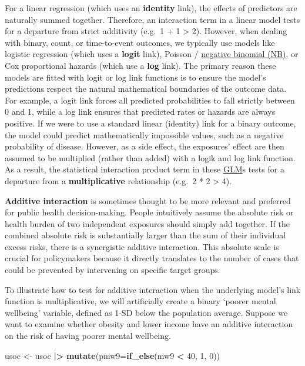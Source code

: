 \documentclass[
]{book}
\newenvironment{Shaded}{\begin{snugshade}}{\end{snugshade}}
\newcommand{\AttributeTok}[1]{\textcolor[rgb]{0.13,0.29,0.53}{#1}}
\newcommand{\DecValTok}[1]{\textcolor[rgb]{0.00,0.00,0.81}{#1}}
\newcommand{\FunctionTok}[1]{\textcolor[rgb]{0.13,0.29,0.53}{\textbf{#1}}}
\newcommand{\NormalTok}[1]{#1}
\newcommand{\OtherTok}[1]{\textcolor[rgb]{0.56,0.35,0.01}{#1}}
\newcommand{\SpecialCharTok}[1]{\textcolor[rgb]{0.81,0.36,0.00}{\textbf{#1}}}
\begin{document}
For a linear regression (which uses an \textbf{identity} link), the effects of predictors are naturally summed together. Therefore, an interaction term in a linear model tests for a departure from strict additivity (e.g.~1 + 1 \textgreater{} 2). However, when dealing with binary, count, or time-to-event outcomes, we typically use models like logistic regression (which uses a \textbf{logit} link), Poisson / \hyperref[acronyms_NB]{negative binomial (NB)}, or Cox proportional hazards (which use a \textbf{log} link). The primary reason these models are fitted with logit or log link functions is to ensure the model's predictions respect the natural mathematical boundaries of the outcome data. For example, a logit link forces all predicted probabilities to fall strictly between 0 and 1, while a log link ensures that predicted rates or hazards are always positive. If we were to use a standard linear (identity) link for a binary outcome, the model could predict mathematically impossible values, such as a negative probability of disease. However, as a side effect, the exposures' effect are then assumed to be multiplied (rather than added) with a logik and log link function. As a result, the statistical interaction product term in these \hyperref[acronyms_GLM]{GLM}s tests for a departure from a \textbf{multiplicative} relationship (e.g.~2 * 2 \textgreater{} 4).

\textbf{Additive interaction} is sometimes thought to be more relevant and preferred for public health decision-making. People intuitively assume the absolute risk or health burden of two independent exposures should simply add together. If the combined absolute risk is substantially larger than the sum of their individual excess risks, there is a synergistic additive interaction. This absolute scale is crucial for policymakers because it directly translates to the number of cases that could be prevented by intervening on specific target groups.

To illustrate how to test for additive interaction when the underlying model's link function is multiplicative, we will artificially create a binary `poorer mental wellbeing' variable, defined as 1-SD below the population average. Suppose we want to examine whether obesity and lower income have an additive interaction on the risk of having poorer mental wellbeing.

\begin{Shaded}
\begin{Highlighting}[]
\NormalTok{usoc }\OtherTok{\textless{}{-}}\NormalTok{ usoc }\SpecialCharTok{|\textgreater{}} 
  \FunctionTok{mutate}\NormalTok{(}\AttributeTok{pmw9=}\FunctionTok{if\_else}\NormalTok{(mw9 }\SpecialCharTok{\textless{}} \DecValTok{40}\NormalTok{, }\DecValTok{1}\NormalTok{, }\DecValTok{0}\NormalTok{))}
\end{Highlighting}
\end{Shaded}
\end{document}
